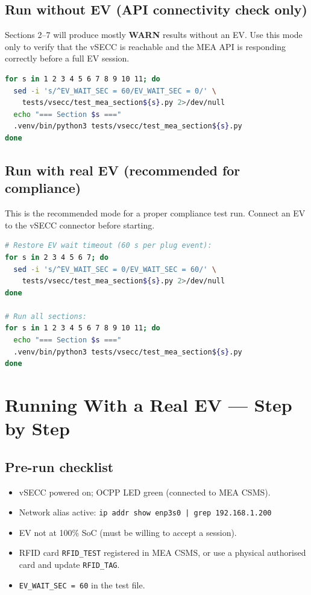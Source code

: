 \documentclass[11pt, a4paper]{article}
\begin{document}
\subsection{Run without EV (API connectivity check only)}

Sections 2--7 will produce mostly \textbf{WARN} results without an EV.
Use this mode only to verify that the vSECC is reachable and the MEA API
is responding correctly before a full EV session.

\begin{lstlisting}[language=bash]
for s in 1 2 3 4 5 6 7 8 9 10 11; do
  sed -i 's/^EV_WAIT_SEC = 60/EV_WAIT_SEC = 0/' \
    tests/vsecc/test_mea_section${s}.py 2>/dev/null
  echo "=== Section $s ==="
  .venv/bin/python3 tests/vsecc/test_mea_section${s}.py
done
\end{lstlisting}

\subsection{Run with real EV (recommended for compliance)}

This is the recommended mode for a proper compliance test run.
Connect an EV to the vSECC connector before starting.

\begin{lstlisting}[language=bash]
# Restore EV wait timeout (60 s per plug event):
for s in 2 3 4 5 6 7; do
  sed -i 's/^EV_WAIT_SEC = 0/EV_WAIT_SEC = 60/' \
    tests/vsecc/test_mea_section${s}.py 2>/dev/null
done

# Run all sections:
for s in 1 2 3 4 5 6 7 8 9 10 11; do
  echo "=== Section $s ==="
  .venv/bin/python3 tests/vsecc/test_mea_section${s}.py
done
\end{lstlisting}

\section{Running With a Real EV --- Step by Step}

\subsection{Pre-run checklist}

\begin{itemize}[nosep]
  \item[$\square$] vSECC powered on; OCPP LED green (connected to MEA CSMS).
  \item[$\square$] Network alias active:
        \texttt{ip addr show enp3s0 | grep 192.168.1.200}
  \item[$\square$] EV not at 100\% SoC (must be willing to accept a session).
  \item[$\square$] RFID card \texttt{RFID\_TEST} registered in MEA CSMS,
        or use a physical authorised card and update \texttt{RFID\_TAG}.
  \item[$\square$] \texttt{EV\_WAIT\_SEC = 60} in the test file.
\end{itemize}
\end{document}
